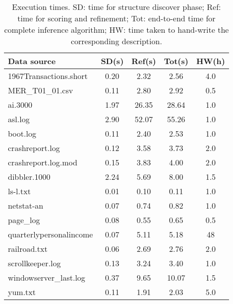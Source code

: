 
\begin{table}
\begin{center}
\begin{tabular}{|l||c|c|c|c|} \hline
Data source			& SD(s)     & Ref(s) 	& Tot(s)  & HW(h)\\ \hline \hline
1967Transactions.short          & 0.20&      2.32&      2.56 	& 4.0 	 \\ \hline
MER\_T01\_01.csv                & 0.11&      2.80&      2.92 	& 0.5 	 \\ \hline
ai.3000                         & 1.97&      26.35&     28.64	& 1.0 	 \\ \hline
asl.log                         & 2.90&      52.07&     55.26	& 1.0 	 \\ \hline
boot.log                        & 0.11&      2.40&      2.53 	& 1.0 	 \\ \hline
crashreport.log                 & 0.12&      3.58&      3.73 	& 2.0 	 \\ \hline
crashreport.log.mod             & 0.15&      3.83&      4.00 	& 2.0 	 \\ \hline
dibbler.1000                    & 2.24&      5.69&      8.00 	& 1.5 	 \\ \hline
ls-l.txt                        & 0.01&      0.10&      0.11 	& 1.0 	 \\ \hline
netstat-an                      & 0.07&      0.74&      0.82 	& 1.0 	 \\ \hline
page\_log                       & 0.08&      0.55&      0.65 	& 0.5 	 \\ \hline
quarterlypersonalincome         & 0.07&      5.11&      5.18 	& 48  	 \\ \hline
railroad.txt                    & 0.06&      2.69&      2.76 	& 2.0 	 \\ \hline
scrollkeeper.log                & 0.13&      3.24&      3.40 	& 1.0 	 \\ \hline
windowserver\_last.log          & 0.37&      9.65&      10.07	& 1.5 	 \\ \hline
yum.txt                         & 0.11&      1.91&      2.03 	& 5.0 	 \\ \hline
\end{tabular}
\caption{Execution times. SD: time for structure discover phase; Ref: time for scoring and 
refinement; Tot: end-to-end time for complete inference algorithm; HW: 
time taken to hand-write the corresponding description.} \shrink
\label{tab:times}
\end{center}
\end{table}


